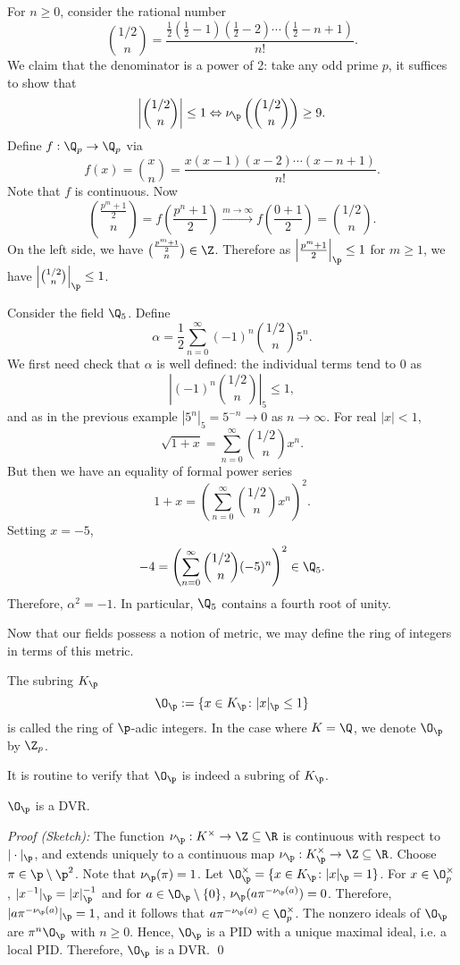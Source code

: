 \begin{ex}
For $n \geq 0$, consider the rational number
	\[
	\binom{1/2}{n} = \dfrac{\frac{1}{2} (\frac{1}{2}-1) (\frac{1}{2}-2) \cdots (\frac{1}{2} - n + 1)}{n!}.
	\]
We claim that the denominator is a power of 2: take any odd prime $p$, it suffices to show that
	\[
	\left| \binom{1/2}{n} \right| \leq 1 \Leftrightarrow \nu_\p\left(\binom{1/2}{n}\right) \geq 9.
	\]
Define $f: \Q_p \to \Q_p$ via
	\[
	f(x) = \binom{x}{n}= \dfrac{x(x-1)(x-2)\cdots(x-n+1)}{n!}.
	\]
Note that $f$ is continuous. Now
	\[
	\binom{\frac{p^m+1}{2}}{n}= f\left(\dfrac{p^n+1}{2}\right) \stackrel{m \to \infty}{\longrightarrow} f\left(\frac{0+1}{2}\right)= \binom{1/2}{n}.
	\]
On the left side, we have $\binom{\frac{p^m+1}{2}}{n} \in \Z$. Therefore as $\left| \frac{p^m+1}{2}\right|_\p \leq 1$ for $m \geq 1$, we have $\left|\binom{1/2}{n}\right|_\p \leq 1$. \xqed
\end{ex}


\begin{ex}
Consider the field $\Q_5$. Define
	\[
	\alpha= \dfrac{1}{2} \sum_{n=0}^\infty (-1)^n \binom{1/2}{n} 5^n.
	\]
We first need check that $\alpha$ is well defined: the individual terms tend to 0 as
	\[
	\left| (-1)^n \binom{1/2}{n} \right|_5 \leq 1,
	\]
and as in the previous example $|5^n|_5=5^{-n} \to 0$ as $n \to \infty$. For real $|x|<1$,
	\[
	\sqrt{1+x}= \sum_{n=0}^\infty \binom{1/2}{n} x^n.
	\]
But then we have an equality of formal power series
	\[
	1+x = \left(\sum_{n=0}^\infty \binom{1/2}{n} x^n \right)^2.
	\]
Setting $x= -5$, 
	\[
	-4 = \left(\sum_{n=0}^\infty \binom{1/2}{n} (-5)^n \right)^2 \in \Q_5.
	\]
Therefore, $\alpha^2= -1$. In particular, $\Q_5$ contains a fourth root of unity. 
\end{ex}

Now that our fields possess a notion of metric, we may define the ring of integers in terms of this metric.

\begin{dfn}
The subring $K_\p$ 
	\[
	\O_\p:= \{x \in K_\p \colon |x|_\p \leq 1\}
	\]
is called the ring of $\p$-adic integers. In the case where $K=\Q$, we denote $\O_\p$ by $\Z_p$.
\end{dfn}

It is routine to verify that $\O_\p$ is indeed a subring of $K_\p$. 

\begin{prop}
$\O_\p$ is a DVR.
\end{prop}

\noindent \emph{Proof (Sketch): }  The function $\nu_\p: K^\times \to \Z \subseteq \R$ is continuous with respect to $|\cdot|_\p$, and extends uniquely to a continuous map $\nu_\p: K_\p^\times \to \Z \subseteq \R$. Choose $\pi \in \p \setminus \p^2$. Note that $\nu_\p(\pi)=1$. Let $\O_\p^\times=\{x \in K_\p \colon |x|_\p=1\}$. For $x \in \O_p^\times$, $|x^{-1}|_\p = |x|_\p^{-1}$ and for $a \in \O_\p \setminus \{0\}$, $\nu_\p(a \pi^{-\nu_\p(a)})=0$. Therefore, $|a\pi^{-\nu_\p(a)}|_\p=1$, and it follows that $a\pi^{-\nu_\p(a)} \in \O_p^\times$. The nonzero ideals of $\O_\p$ are $\pi^n \O_\p$ with $n \geq 0$. Hence, $\O_\p$ is a PID with a unique maximal ideal, i.e. a local PID. Therefore, $\O_\p$ is a DVR. \qed \\


